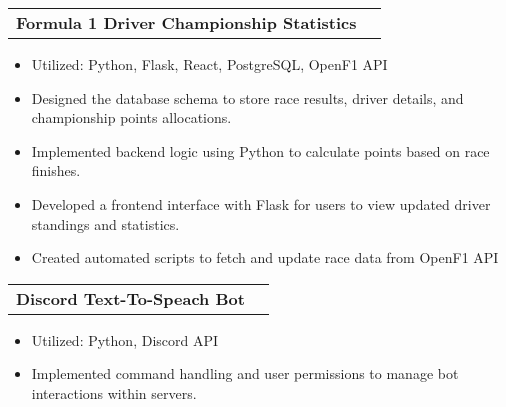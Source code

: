 \documentclass[letterpaper,11pt]{article}
\makeatletter
\newcommand{\resumeItem}[1]{
  \item\small{
    {#1 \vspace{-3pt}}
  }
}
\newcommand{\resumeProjectHeading}[2]{
    \item
    \begin{tabular*}{0.97\textwidth}{l@{\extracolsep{\fill}}r@{\hspace{-0.2in}}}
        \small#1 & #2 \\
    \end{tabular*}\vspace{-7pt}
}
\newcommand{\resumeItemListStart}{\begin{itemize}[leftmargin=0.15in, rightmargin=0.15in]}
\newcommand{\resumeItemListEnd}{\end{itemize}\vspace{-7pt}}
\makeatother
\begin{document}
        \resumeProjectHeading
            {\textbf{Formula 1 Driver Championship Statistics} {}}{}
            \resumeItemListStart
                \resumeItem{Utilized: Python, Flask, React, PostgreSQL, OpenF1 API}
                \resumeItem{Designed the database schema to store race results, driver details, and championship points allocations.}
                \resumeItem{Implemented backend logic using Python to calculate points based on race finishes.}
                \resumeItem{Developed a frontend interface with Flask for users to view updated driver standings and statistics.}            
                \resumeItem{Created automated scripts to fetch and update race data from OpenF1 API}            
            \resumeItemListEnd

        \resumeProjectHeading
            {\textbf{Discord Text-To-Speach Bot} {}}{}
            \resumeItemListStart
                \resumeItem{Utilized: Python, Discord API}
                \resumeItem{Implemented command handling and user permissions to manage bot interactions within servers.}
            \resumeItemListEnd

        
        
\end{document}
